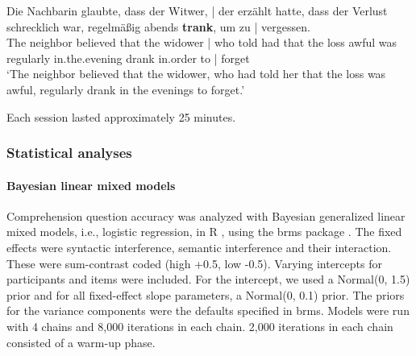 \documentclass[a4paper, man, floatsintext]{apa7}
\begin{document}
\begin{exe}  
\ex \label{ex:linebreak}
    \gll Die Nachbarin glaubte, dass der Witwer, | der erzählt hatte, dass der Verlust schrecklich war, regelmäßig abends \textbf{trank}, um zu | vergessen. \\ 
    The neighbor believed that the widower | who told had that the loss awful was regularly in.the.evening drank in.order to | forget\\
    \trans  `The neighbor believed that the widower, who had told her that the loss was awful, regularly drank in the evenings to forget.'\\  
\end{exe}

\label{fillers1} Each session lasted approximately 25 minutes.

\subsubsection{Statistical analyses}

\paragraph{Bayesian linear mixed models}
Comprehension question accuracy was analyzed with Bayesian generalized linear mixed models, i.e., logistic regression, in R \citep{r}, using the brms package \citep{brms}. The fixed effects were syntactic interference, semantic interference and their interaction. These were sum-contrast coded (high +0.5, low -0.5). Varying intercepts for participants and items were included. For the intercept, we used a Normal(0, 1.5) prior and  for all fixed-effect slope parameters, a Normal(0, 0.1) prior. The priors for the variance components were the defaults specified in brms. Models were run with 4 chains and 8,000 iterations in each chain. 2,000 iterations in each chain consisted of a warm-up phase. 
\end{document}
